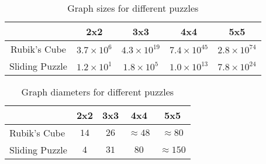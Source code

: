 \begin{itemize}
\end{itemize}


\begin{table}[h!]
    \centering
    \begin{tabular}{ccccc}
        \toprule
        & 2x2 & 3x3 & 4x4 & 5x5 \\
		\midrule
        Rubik's Cube & $3.7 \times 10^{6}$ & $4.3 \times 10^{19}$ & $7.4 \times 10^{45}$ & $2.8 \times 10^{74}$ \\
        Sliding Puzzle & $1.2 \times 10^{1}$ & $1.8 \times 10^{5}$ & $1.0 \times 10^{13}$ & $7.8 \times 10^{24}$ \\
        \bottomrule
    \end{tabular}
    \caption{Graph sizes for different puzzles}
\end{table}



\begin{table}[h!]
\centering
\begin{tabular}{@{} lcccc @{}}
    \toprule
    & 2x2 & 3x3 & 4x4 & 5x5 \\
    \midrule
    Rubik's Cube & $14$ & $26$ & $\approx 48$ & $\approx 80$ \\
    Sliding Puzzle & $4$ & $31$ & $80$ & $\approx 150$ \\
    \bottomrule
\end{tabular}
\caption{Graph diameters for different puzzles}
\end{table}